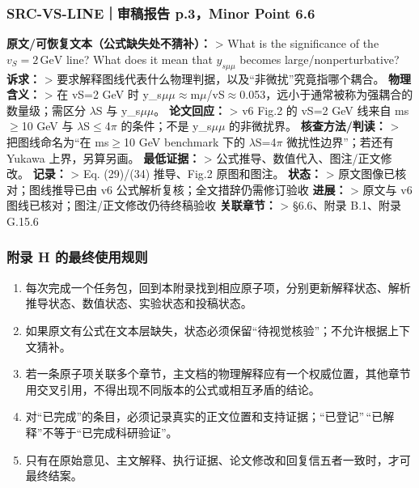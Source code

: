 \documentclass[
  chinese,
  UTF8]{ctexart}
\providecommand{\tightlist}{%
  \setlength{\itemsep}{0pt}\setlength{\parskip}{0pt}}
\begin{document}
\subsubsection{SRC-VS-LINE｜审稿报告 p.3，Minor Point
6.6}\label{src-vs-lineux5ba1ux7a3fux62a5ux544a-p.3minor-point-6.6}

\textbf{原文/可恢复文本（公式缺失处不猜补）：} \textgreater{} What is
the significance of the \(v_S=2\,\mathrm{GeV}\) line? What does it mean
that \(y_{s\mu\mu}\) becomes large/nonperturbative? \textbf{诉求：}
\textgreater{}
要求解释图线代表什么物理判据，以及``非微扰''究竟指哪个耦合。
\textbf{物理含义：} \textgreater{} 在 vS=2 GeV 时
y\_s\ensuremath{\mu}\ensuremath{\mu}\ensuremath{\approx}m\ensuremath{\mu}/vS\ensuremath{\approx}0.053，远小于通常被称为强耦合的数量级；需区分
\ensuremath{\lambda}S 与 y\_s\ensuremath{\mu}\ensuremath{\mu}。
\textbf{论文回应：} \textgreater{} v6 Fig.2 的 vS=2 GeV 线来自
ms\ensuremath{\geq}10 GeV 与
\ensuremath{\lambda}S\ensuremath{\leq}4\ensuremath{\pi} 的条件；不是
y\_s\ensuremath{\mu}\ensuremath{\mu} 的非微扰界。
\textbf{核查方法/判读：} \textgreater{} 把图线命名为``在
ms\ensuremath{\geq}10 GeV benchmark 下的
\ensuremath{\lambda}S=4\ensuremath{\pi} 微扰性边界''；若还有 Yukawa
上界，另算另画。 \textbf{最低证据：} \textgreater{}
公式推导、数值代入、图注/正文修改。 \textbf{记录：} \textgreater{} Eq.
(29)/(34) 推导、Fig.2 原图和图注。 \textbf{状态：} \textgreater{}
原文图像已核对；图线推导已由 v6 公式解析复核；全文措辞仍需修订验收
\textbf{进展：} \textgreater{} 原文与 v6
图线已核对；图注/正文修改仍待终稿验收 \textbf{关联章节：} \textgreater{}
§6.6、附录 B.1、附录 G.15.6

\subsubsection{附录 H
的最终使用规则}\label{ux9644ux5f55-h-ux7684ux6700ux7ec8ux4f7fux7528ux89c4ux5219}

\begin{enumerate}
\def\labelenumi{\arabic{enumi}.}
\tightlist
\item
  每次完成一个任务包，回到本附录找到相应原子项，分别更新解释状态、解析推导状态、数值状态、实验状态和投稿状态。
\item
  如果原文有公式在文本层缺失，状态必须保留``待视觉核验''；不允许根据上下文猜补。
\item
  若一条原子项关联多个章节，主文档的物理解释应有一个权威位置，其他章节用交叉引用，不得出现不同版本的公式或相互矛盾的结论。
\item
  对``已完成''的条目，必须记录真实的正文位置和支持证据；``已登记''\,``已解释''不等于``已完成科研验证''。
\item
  只有在原始意见、主文解释、执行证据、论文修改和回复信五者一致时，才可最终结案。
\end{enumerate}
\end{document}
